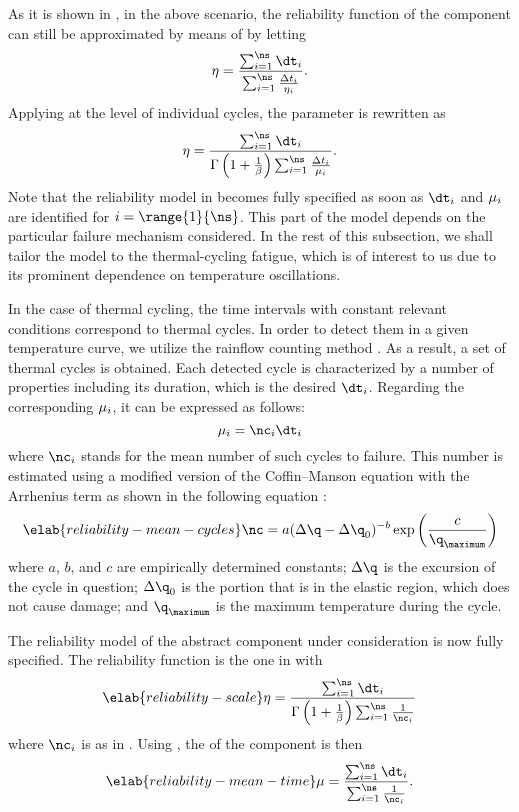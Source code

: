 As it is shown in \cite{xiang2010}, in the above scenario, the reliability
function of the component can still be approximated by means of
 by letting
\[
  \scale = \frac{\sum_{i = 1}^\ns \dt_i}{\sum_{i = 1}^\ns \frac{\Delta t_i}{\scale_i}}.
\]
Applying  at the level of individual cycles, the
parameter is rewritten as
\[
  \scale = \frac{\sum_{i = 1}^\ns \dt_i}{\Gamma\left(1 + \frac{1}{\shape}\right) \sum_{i = 1}^\ns \frac{\Delta t_i}{\mean_i}}.
\]
Note that the reliability model in  becomes fully
specified as soon as $\dt_i$ and $\mu_i$ are identified for $i =
\range{1}{\ns}$. This part of the model depends on the particular failure
mechanism considered. In the rest of this subsection, we shall tailor the model
to the thermal-cycling fatigue, which is of interest to us due to its prominent
dependence on temperature oscillations.

In the case of thermal cycling, the time intervals with constant relevant
conditions correspond to thermal cycles. In order to detect them in a given
temperature curve, we utilize the rainflow counting method \cite{xiang2010}. As
a result, a set of \ns thermal cycles is obtained. Each detected cycle is
characterized by a number of properties including its duration, which is the
desired $\dt_i$. Regarding the corresponding $\mu_i$, it can be expressed as
follows:
\[
  \mean_i = \nc_i \dt_i
\]
where $\nc_i$ stands for the mean number of such cycles to failure. This number
is estimated using a modified version of the Coffin--Manson equation with the
Arrhenius term as shown in the following equation \cite{xiang2010, jedec2010}:
\begin{equation} \elab{reliability-mean-cycles}
  \nc = a (\Delta \q - \Delta \q_0)^{-b} \exp\left(\frac{c}{\q_\maximum}\right)
\end{equation}
where $a$, $b$, and $c$ are empirically determined constants; $\Delta \q$ is the
excursion of the cycle in question; $\Delta \q_0$ is the portion that is in the
elastic region, which does not cause damage; and $\q_\maximum$ is the maximum
temperature during the cycle.

The reliability model of the abstract component under consideration is now fully
specified. The reliability function is the one in 
with
\begin{equation} \elab{reliability-scale}
  \scale = \frac{\sum_{i = 1}^\ns \dt_i}{\Gamma\left(1 + \frac{1}{\shape}\right) \sum_{i = 1}^\ns \frac{1}{\nc_i}}
\end{equation}
where $\nc_i$ is as in . Using
, the  of the
component is then
\begin{equation} \elab{reliability-mean-time}
  \mean = \frac{\sum_{i = 1}^\ns \dt_i}{\sum_{i = 1}^\ns \frac{1}{\nc_i}}.
\end{equation}


